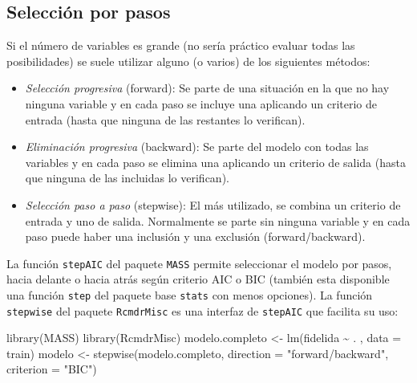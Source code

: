 \documentclass[
]{book}
\newenvironment{Shaded}{\begin{snugshade}}{\end{snugshade}}
\newcommand{\AttributeTok}[1]{\textcolor[rgb]{0.77,0.63,0.00}{#1}}
\newcommand{\FunctionTok}[1]{\textcolor[rgb]{0.00,0.00,0.00}{#1}}
\newcommand{\NormalTok}[1]{#1}
\newcommand{\OtherTok}[1]{\textcolor[rgb]{0.56,0.35,0.01}{#1}}
\newcommand{\SpecialCharTok}[1]{\textcolor[rgb]{0.00,0.00,0.00}{#1}}
\newcommand{\StringTok}[1]{\textcolor[rgb]{0.31,0.60,0.02}{#1}}
\theoremstyle{break}
\theoremstyle{definition}
\theoremstyle{definition}
\theoremstyle{definition}
\theoremstyle{definition}
\theoremstyle{remark}
\begin{document}
\hypertarget{selecciuxf3n-por-pasos}{%
\subsection{Selección por pasos}\label{selecciuxf3n-por-pasos}}

Si el número de variables es grande (no sería práctico evaluar todas las posibilidades)
se suele utilizar alguno (o varios) de los siguientes métodos:

\begin{itemize}
\item
  \emph{Selección progresiva} (forward): Se parte de una situación en la
  que no hay ninguna variable y en cada paso se incluye una aplicando
  un criterio de entrada (hasta que ninguna de las restantes lo
  verifican).
\item
  \emph{Eliminación progresiva} (backward): Se parte del modelo con todas
  las variables y en cada paso se elimina una aplicando un criterio
  de salida (hasta que ninguna de las incluidas lo verifican).
\item
  \emph{Selección paso a paso} (stepwise): El más utilizado, se combina
  un criterio de entrada y uno de salida. Normalmente se parte sin
  ninguna variable y en cada paso puede haber una inclusión y una
  exclusión (forward/backward).
\end{itemize}

La función \texttt{stepAIC} del paquete \texttt{MASS} permite seleccionar el modelo por pasos, hacia delante o hacia atrás según criterio AIC o BIC (también esta disponible una función \texttt{step} del paquete base \texttt{stats} con menos opciones).
La función \texttt{stepwise} del paquete \texttt{RcmdrMisc} es una interfaz de \texttt{stepAIC} que facilita su uso:

\begin{Shaded}
\begin{Highlighting}[]
\FunctionTok{library}\NormalTok{(MASS)}
\FunctionTok{library}\NormalTok{(RcmdrMisc)}
\NormalTok{modelo.completo }\OtherTok{\textless{}{-}} \FunctionTok{lm}\NormalTok{(fidelida }\SpecialCharTok{\textasciitilde{}}\NormalTok{ . , }\AttributeTok{data =}\NormalTok{ train)}
\NormalTok{modelo }\OtherTok{\textless{}{-}} \FunctionTok{stepwise}\NormalTok{(modelo.completo, }\AttributeTok{direction =} \StringTok{"forward/backward"}\NormalTok{, }\AttributeTok{criterion =} \StringTok{"BIC"}\NormalTok{)}
\end{Highlighting}
\end{Shaded}
\end{document}
